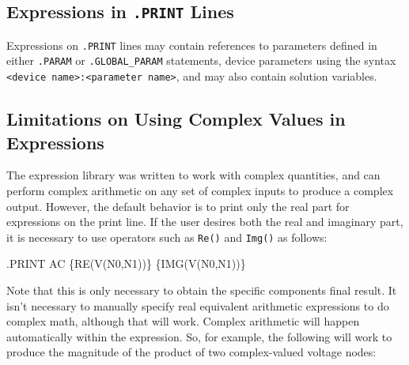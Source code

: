 
\subsection{Expressions in \texttt{.PRINT} Lines}

Expressions on \texttt{.PRINT} lines may contain references to
parameters defined in either \texttt{.PARAM} or
\texttt{.GLOBAL\_PARAM} statements, device parameters using the syntax
\texttt{<device name>:<parameter name>}, and may also contain solution
variables.

\begin{centering}
\end{centering}

\subsection{Limitations on Using Complex Values in Expressions}
\label{ComplexExpressions}
The \Xyce{} expression library was written to work with complex
quantities, and can perform complex arithmetic on any set of 
complex inputs to produce a complex output.
However, the default behavior is to print only the real part 
for expressions on the print line.  If the user desires both the
real and imaginary part, it is necessary to use operators 
such as \texttt{Re()} and \texttt{Img()} as follows:

\begin{vquote}
.PRINT AC  \{RE(V(N0,N1))\} \{IMG(V(N0,N1))\}
\end{vquote}

Note that this is only necessary to obtain the specific components 
final result.   It isn't necessary to manually specify real equivalent 
arithmetic expressions to do complex math, although that will work.  Complex 
arithmetic will happen automatically within the expression.  So, for example,
the following will work to produce the magnitude of the product of two 
complex-valued voltage nodes:

